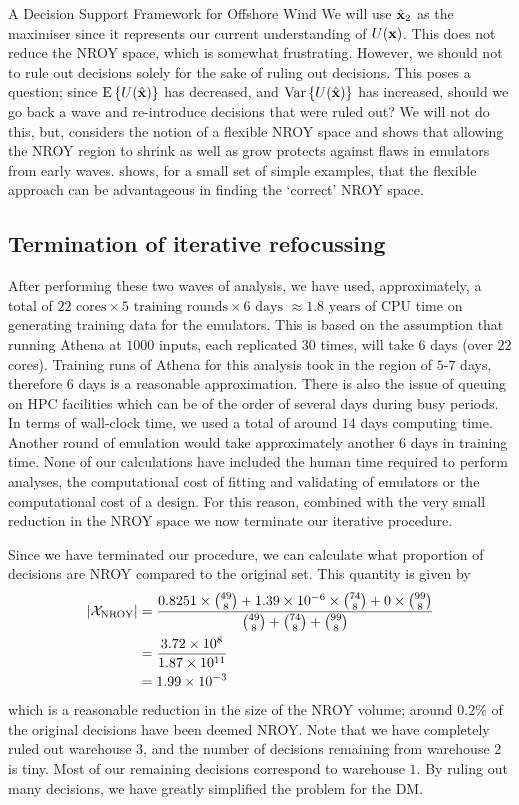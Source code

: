 \begin{chapter}{A Decision Support Framework for Offshore Wind \label{Ch:ds-for-ow}}
We will use $\hat{\mathbf{x}}_2$ as the maximiser since it represents our current understanding of $U(\mathbf{x})$. This does not reduce the NROY space, which is somewhat frustrating. However, we should not to rule out decisions solely for the sake of ruling out decisions. This poses a question; since $\textrm{E}\,\{U(\hat{\mathbf{x}})\}$ has decreased, and $\mathrm{Var}\,\{U(\hat{\mathbf{x}})\}$ has increased, should we go back a wave and re-introduce decisions that were ruled out? We will not do this, but, \citet{baker-thesis2021} considers the notion of a flexible NROY space and shows that allowing the NROY region to shrink as well as grow protects against flaws in emulators from early waves. \citet{baker-thesis2021} shows, for a small set of simple examples, that the flexible approach can be advantageous in finding the `correct' NROY space.
\subsection{Termination of iterative refocussing}
After performing these two waves of analysis, we have used, approximately, a total of $22 \text{ cores} \times 5 \text{ training rounds} \times 6 \text{ days } \approx 1.8 \text{ years}$ of CPU time on generating training data for the emulators. This is based on the assumption that running Athena at $1000$ inputs, each replicated $30$ times, will take $6$ days (over $22$ cores). Training runs of Athena for this analysis took in the region of $5$-$7$ days, therefore $6$ days is a reasonable approximation. There is also the issue of queuing on HPC facilities which can be of the order of several days during busy periods. In terms of wall-clock time, we used a total of around $14$ days computing time. Another round of emulation would take approximately another $6$ days in training time. None of our calculations have included the human time required to perform analyses, the computational cost of fitting and validating of emulators or the computational cost of a design. For this reason, combined with the very small reduction in the NROY space we now terminate our iterative procedure.

Since we have terminated our procedure, we can calculate what proportion of decisions are NROY compared to the original set. This quantity is given by
\begin{align*}
 |\mathcal{X}_{\text{NROY}}| &= \frac{0.8251 \times {49 \choose 8} + 1.39 \times 10^{-6} \times {74 \choose 8} + 0 \times {99 \choose 8}}{{49 \choose 8} + {74 \choose 8} + {99 \choose 8}}\\
 &= \frac{3.72 \times 10^8}{1.87 \times 10^{11}}\\
 &= 1.99 \times 10^{-3}
\end{align*}
which is a reasonable reduction in the size of the NROY volume; around $0.2\%$ of the original decisions have been deemed NROY. Note that we have completely ruled out warehouse $3$, and the number of decisions remaining from warehouse $2$ is tiny. Most of our remaining decisions correspond to warehouse $1$. By ruling out many decisions, we have greatly simplified the problem for the DM.

\end{chapter}
